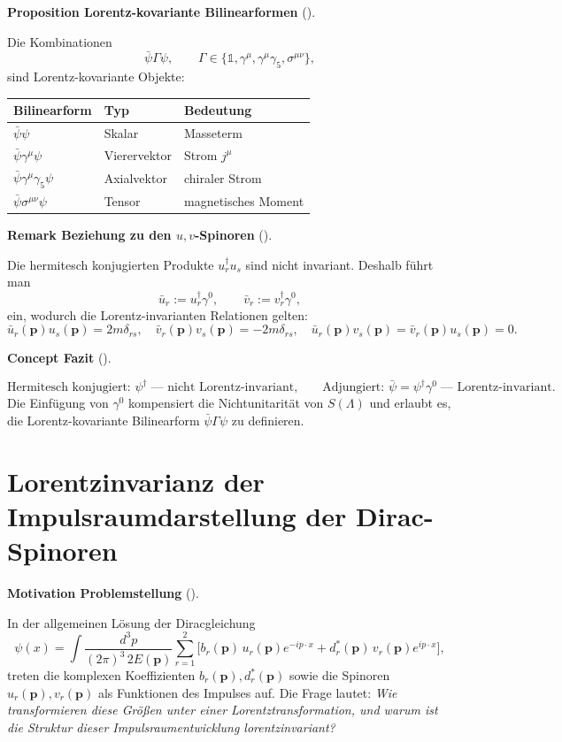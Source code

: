 \documentclass[10pt, letterpaper]{article}
\newcommand{\CustomHeading}[3]{%
  \par\medskip\noindent%
  \textbf{#1 #2} \textnormal{(#3)}.\enskip%
}
\newenvironment{PROP}[2]{\begin{unitbox}\CustomHeading{Proposition}{#1}{#2}}{\end{unitbox}}
\newenvironment{REM}[2]{\begin{unitbox}\CustomHeading{Remark}{#1}{#2}}{\end{unitbox}}
\newenvironment{CONC}[2]{\begin{unitbox}\CustomHeading{Concept}{#1}{#2}}{\end{unitbox}}
\newenvironment{MOT}[2]{\begin{unitbox}\CustomHeading{Motivation}{#1}{#2}}{\end{unitbox}}
\begin{document}
\begin{PROP}{Lorentz-kovariante Bilinearformen}{}
Die Kombinationen
\[
\bar{\psi}\Gamma\psi,
\qquad \Gamma\in\{\mathbb{1},\gamma^\mu,\gamma^\mu\gamma_5,\sigma^{\mu\nu}\},
\]
sind Lorentz-kovariante Objekte:

\begin{center}
\begin{tabular}{|l|l|l|}
\hline
Bilinearform & Typ & Bedeutung \\
\hline
$\bar{\psi}\psi$ & Skalar & Masseterm \\
$\bar{\psi}\gamma^\mu\psi$ & Vierervektor & Strom $j^\mu$ \\
$\bar{\psi}\gamma^\mu\gamma_5\psi$ & Axialvektor & chiraler Strom \\
$\bar{\psi}\sigma^{\mu\nu}\psi$ & Tensor & magnetisches Moment \\
\hline
\end{tabular}
\end{center}
\end{PROP}

\begin{REM}{Beziehung zu den $u,v$-Spinoren}{}
Die hermitesch konjugierten Produkte $u_r^\dagger u_s$ sind nicht invariant.
Deshalb führt man
\[
\bar{u}_r:=u_r^\dagger\gamma^0,\qquad
\bar{v}_r:=v_r^\dagger\gamma^0,
\]
ein, wodurch die Lorentz-invarianten Relationen gelten:
\[
\bar{u}_r(\mathbf{p})u_s(\mathbf{p})=2m\delta_{rs},\quad
\bar{v}_r(\mathbf{p})v_s(\mathbf{p})=-2m\delta_{rs},\quad
\bar{u}_r(\mathbf{p})v_s(\mathbf{p})=\bar{v}_r(\mathbf{p})u_s(\mathbf{p})=0.
\]
\end{REM}

\begin{CONC}{Fazit}{}
\[
\boxed{
\text{Hermitesch konjugiert: }\psi^\dagger
\;\text{--- nicht Lorentz-invariant,}
\qquad
\text{Adjungiert: }\bar{\psi}=\psi^\dagger\gamma^0
\;\text{--- Lorentz-invariant.}
}
\]
Die Einfügung von $\gamma^0$ kompensiert die Nichtunitarität von $S(\Lambda)$
und erlaubt es, die Lorentz-kovariante Bilinearform $\bar{\psi}\Gamma\psi$
zu definieren.
\end{CONC}



\pagebreak

\section{Lorentzinvarianz der Impulsraumdarstellung der Dirac-Spinoren}

\begin{MOT}{Problemstellung}{}
In der allgemeinen Lösung der Diracgleichung
\[
\psi(x)
=\int \frac{d^3p}{(2\pi)^3\,2E(\mathbf p)}
\sum_{r=1}^2
\Big[b_r(\mathbf p)\,u_r(\mathbf p)e^{-ip\cdot x}
+d_r^*(\mathbf p)\,v_r(\mathbf p)e^{ip\cdot x}\Big],
\]
treten die komplexen Koeffizienten $b_r(\mathbf p),d_r^*(\mathbf p)$ sowie die Spinoren $u_r(\mathbf p),v_r(\mathbf p)$ als Funktionen des Impulses auf.  
Die Frage lautet: \emph{Wie transformieren diese Größen unter einer Lorentztransformation, und warum ist die Struktur dieser Impulsraumentwicklung lorentzinvariant?}
\end{MOT}
\end{document}
